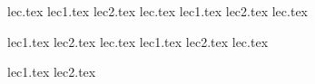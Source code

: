 \documentclass[utf8x, 12pt]{G7-32}
\begin{document}
\mainmatter
\nobreakingbeforechapters


\setcounter{page}{2}

\tableofcontents

{lec.tex}%
{lec1.tex}%
{lec2.tex}%
{lec.tex}%
{lec1.tex}%
{lec2.tex}%
{lec.tex}%

{lec1.tex}%
{lec2.tex}%
{lec.tex}%
{lec1.tex}%
{lec2.tex}%
{lec.tex}%

{lec1.tex}%
{lec2.tex}%



\end{document}
